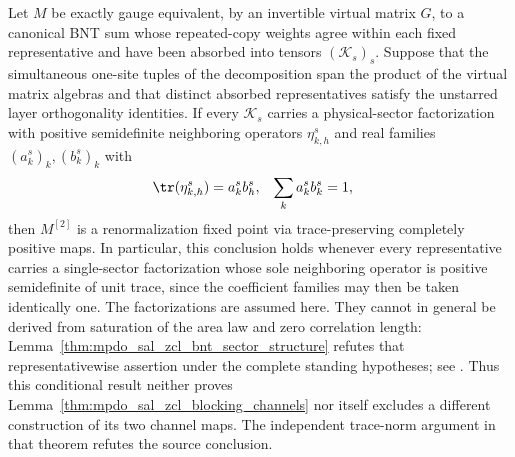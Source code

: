 \begin{lemma}
    \label{thm:mpdo_absorbed_factorization_blocking_channels}
    \leanok
    Let $M$ be exactly gauge equivalent, by an invertible virtual matrix $G$,
    to a canonical BNT sum whose repeated-copy weights agree within each
    fixed representative and have been absorbed into tensors
    $(\mathcal K_s)_s$. Suppose that the simultaneous one-site tuples of the
    decomposition span the product of the virtual matrix algebras and that
    distinct absorbed representatives satisfy the unstarred layer
    orthogonality identities. If every $\mathcal K_s$ carries a
    physical-sector factorization with positive semidefinite neighboring
    operators $\eta^s_{k,h}$ and real families $(a^s_k)_k,(b^s_k)_k$ with
    \begin{align}
        \tr(\eta^s_{k,h}) & =a^s_kb^s_h,
                          &
        \sum_ka^s_kb^s_k  & =1,
        \notag
    \end{align}
    then $M^{[2]}$ is a renormalization fixed point via trace-preserving
    completely positive maps. In particular, this conclusion holds whenever
    every representative carries a single-sector factorization whose sole
    neighboring operator is positive semidefinite of unit trace, since the
    coefficient families may then be taken identically one. The
    factorizations are assumed here. They cannot in general be derived from
    saturation of the area law and zero correlation length:
    Lemma~\ref{thm:mpdo_sal_zcl_bnt_sector_structure} refutes that
    representativewise assertion under the complete standing hypotheses; see
    \cite{gap:cpgsv17_pf_rank_one}. Thus this conditional result neither proves
    Lemma~\ref{thm:mpdo_sal_zcl_blocking_channels} nor itself excludes a
    different construction of its two channel maps. The independent
    trace-norm argument in that theorem refutes the source conclusion.
\end{lemma}

